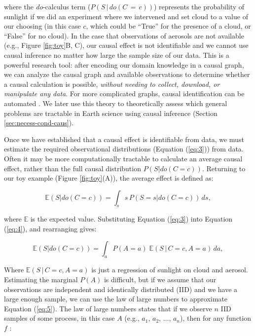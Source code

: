 \documentclass[12pt]{article}
\begin{document}
where the \textit{do}-calculus \citep{pearl2009} term
($P(S \, | \, do(C\, = \,c))$) represents the probability of sunlight
if we did an experiment where we intervened and set cloud to a value
of our choosing (in this case $c$, which could be ``True'' for the
presence of a cloud, or ``False'' for no cloud). In the case that
observations of aerosols are not available (e.g., Figure
\ref{fig:toy}B, C), our causal effect is not identifiable and we
cannot use causal inference no matter how large the sample size of our
data. This is a powerful research tool: after encoding our domain
knowledge in a causal graph, we can analyze the causal graph and
available observations to determine whether a causal calculation is
possible, \textit{without needing to collect, download, or manipulate
  any data}. For more complicated graphs, causal identification can be
automated \citep{shpitser2006}. We later use this theory to
theoretically assess which general problems are tractable in Earth
science using causal inference (Section \ref{sec:necess-cond-caus}).

Once we have established that a causal effect is identifiable from
data, we must estimate the required observational distributions
(Equation (\ref{eq:3})) from data. Often it may be more computationally
tractable to calculate an average causal effect, rather than the full
causal distribution $P(S | do(C=c))$. Returning to our toy example
(Figure \ref{fig:toy}(A)), the average effect is defined as:

\begin{equation}
  \mathbb{E}(S | do(C = c)) = \int_{s} s \, P(S = s
  | do(C=c)) \, ds,
  \label{eq:4}
\end{equation}

where $\mathbb{E}$ is the expected value. Substituting Equation
(\ref{eq:3}) into Equation (\ref{eq:4}), and rearranging gives:

\begin{equation}
  \mathbb{E}(S | do(C = c))  = \int_{a} P(A=a) \; \mathbb{E}(S \, | \,
  C=c, A=a) \, d a,
  \label{eq:5}
\end{equation}

Where $\mathbb{E}(S \, | \, C=c, A=a)$ is just a regression of sunlight on
cloud and aerosol. Estimating the marginal $P(A)$ is difficult, but
if we assume that our observations are independent and identically
distributed (IID) and we have a large enough sample, we can use the
law of large numbers to approximate Equation (\ref{eq:5}). The law of
large numbers states that if we observe $n$ IID samples of some process, in
this case $A$ (e.g., $a_1$, $a_2$, $\ldots$, $a_n$), then for any
function $f$ \citep{shalizi2013}:
\end{document}

